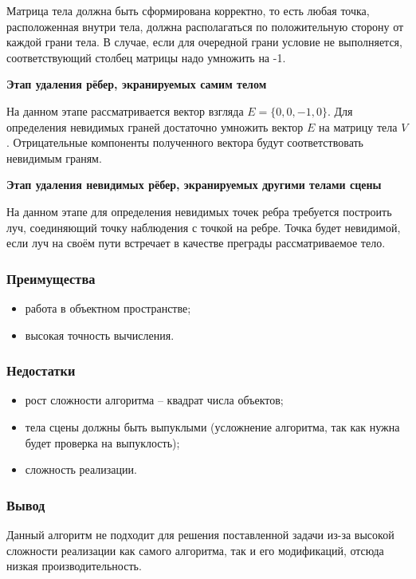 Матрица тела должна быть сформирована корректно, то есть любая точка, расположенная внутри тела, должна располагаться по положительную сторону от каждой грани тела. В случае, если для очередной грани условие не выполняется, соответствующий столбец матрицы надо умножить на -1. 

\textbf{Этап удаления рёбер, экранируемых самим телом}

На данном этапе рассматривается вектор взгляда $E=\{0, 0,-1, 0\}$.
Для определения невидимых граней достаточно умножить вектор $E$ на матрицу тела $V$. Отрицательные компоненты полученного вектора будут соответствовать невидимым граням.

\textbf{Этап удаления невидимых рёбер, экранируемых другими телами сцены}

На данном этапе для определения невидимых точек ребра требуется построить луч, соединяющий точку наблюдения с точкой на ребре. Точка будет невидимой, если луч на своём пути встречает в качестве преграды рассматриваемое тело.

\subsubsection*{Преимущества}
\begin{itemize}
	\item работа в объектном пространстве;
	\item высокая точность вычисления.
\end{itemize}

\subsubsection*{Недостатки}
\begin{itemize}
	\item рост сложности алгоритма – квадрат числа объектов;
	\item тела сцены должны быть выпуклыми (усложнение алгоритма, так как нужна будет проверка на выпуклость);
	\item сложность реализации.
\end{itemize}

\subsubsection*{Вывод}
Данный алгоритм не подходит для решения поставленной задачи из-за высокой сложности реализации как самого алгоритма, так и его модификаций, отсюда низкая производительность.



